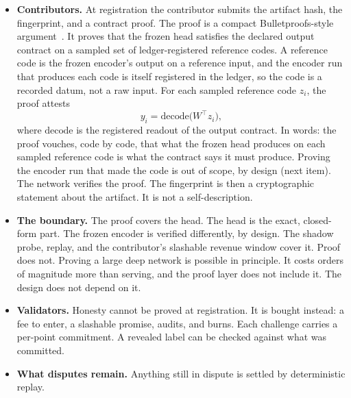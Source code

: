 \documentclass[11pt]{article}
\begin{document}
\begin{itemize}
    \item \textbf{Contributors.} At registration the contributor
          submits the artifact hash, the fingerprint, and a contract proof.
          The proof is a compact Bulletproofs-style
          argument~\cite{bunz2018}. It proves that the frozen head
          satisfies the declared output contract on a sampled set of
          ledger-registered reference codes. A reference code is the frozen
          encoder's output on a reference input, and the encoder run that
          produces each code is itself registered in the ledger, so the
          code is a recorded datum, not a raw input. For each sampled
          reference code $z_i$, the proof attests
          \begin{equation}
              y_i = \mathrm{decode}\bigl(W^\top z_i\bigr),
          \end{equation}
          where $\mathrm{decode}$ is the registered readout of the output
          contract. In words: the proof vouches, code by code, that what
          the frozen head produces on each sampled reference code is what
          the contract says it must produce. Proving the encoder run that
          made the code is out of scope, by design (next item). The network
          verifies the proof. The fingerprint is then a cryptographic
          statement about
          the artifact.
          It is not a self-description.
    \item \textbf{The boundary.} The proof covers the head. The head
          is the exact, closed-form part. The frozen encoder is verified
          differently, by design. The shadow probe, replay, and the
          contributor's slashable revenue window cover it. Proof does not.
          Proving a large deep network is possible in principle. It costs
          orders of magnitude more than serving, and the proof layer does
          not include it. The design does not depend on it.
    \item \textbf{Validators.} Honesty cannot be proved at
          registration. It is bought instead: a fee to enter, a slashable
          promise, audits, and burns. Each challenge carries a per-point
          commitment. A revealed label can be checked against what was
          committed.
    \item \textbf{What disputes remain.} Anything still in dispute is
          settled by deterministic replay.
\end{itemize}
\end{document}
